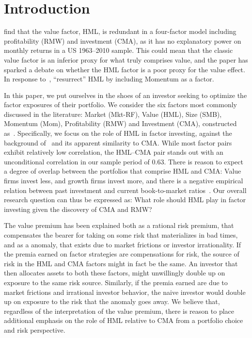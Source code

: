 \section{Introduction}
\textcite{FF2015} find that the value factor, HML, is redundant in a four-factor model including profitability (RMW) and investment (CMA), as it has no explanatory power on monthly returns in a US 1963–2010 sample. This could mean that the classic value factor is an inferior proxy for what truly comprises value, and the paper has sparked a debate on whether the HML factor is a poor proxy for the value effect. In response to~\textcite{FF2015}, \textcite{Asness2015} ``resurrect'' HML by including Momentum as a factor.

In this paper, we put ourselves in the shoes of an investor seeking to optimize the factor exposures of their portfolio. We consider the six factors most commonly discussed in the literature: Market (Mkt-RF), Value (HML), Size (SMB), Momentum (Mom), Profitability (RMW) and Investment (CMA), constructed as~\textcite{FF2015}. Specifically, we focus on the role of HML in factor investing, against the background of~\textcite{FF2015,Assness2015} and its apparent similarity to CMA. While most factor pairs exhibit relatively low correlation, the HML--CMA pair stands out with an unconditional correlation in our sample period of 0.63. There is reason to expect a degree of overlap between the portfolios that comprise HML and CMA: Value firms invest less, and growth firms invest more, and there is a negative empirical relation between past investment and current book-to-market ratios~\autocite{Zhang2005,AndersonGarciaFeijoo2006}. Our overall research question can thus be expressed as: What role should HML play in factor investing given the discovery of CMA and RMW?

The value premium has been explained both as a rational risk premium, that compensates the bearer for taking on some risk that materializes in bad times, and as a anomaly, that exists due to market frictions or investor irrationality. If the premia earned on factor strategies are compensations for risk, the source of risk in the HML and CMA factors might in fact be the same. An investor that then allocates assets to both these factors, might unwillingly double up on exposure to the same risk source. Similarly, if the premia earned are due to market frictions and irrational investor behavior, the naive investor would double up on exposure to the risk that the anomaly goes away. We believe that, regardless of the interpretation of the value premium, there is reason to place additional emphasis on the role of HML relative to CMA from a portfolio choice and risk perspective.

